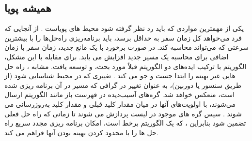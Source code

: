 \subsection{همیشه پویا}
یکی از مهمترین مواردی که باید رد نظر گرفته شود محیط های پویاست . از آنجایی که فرد می‌خواهد کل زمان سفر به حداقل برسد، باید برنامه‌ریزی راه‌حل‌ها را با بیشترین سرعتی که می‌تواند محاسبه کند. در صورت برخورد با یک مانع جدید، زمان سفر با زمان اضافی برای محاسبه یک مسیر جدید افزایش می یابد. برای مقابله با این مشکل، الگوریتم
با ترکیب ایده‌های دو الگوریتم قبلاً مورد بحث،
و 
توسعه یافت. مشابه 
،
راه حل هایی غیر بهینه را ابتدا جست و جو می کند . تغییری که در محیط شناسایی شود (از طریق سنسور یا دوربین)، به عنوان تغییر در گرافی که مسیر در آن برنامه ریزی شده است، منعکس خواهد شد. گره‌های آسیب‌دیده در فهرست باز مانند الگوریتم
ارسال می‌شوند، با اولویت‌های آنها در میان مقدار کلید قبلی و مقدار کلید به‌روزرسانی می شوند . سپس گره های موجود در لیست پردازش می شوند تا زمانی که راه حل فعلی تضمین شود بنابراین
، که یک الگوریتم  برخط است، امکان برنامه ریزی مجدد سریع راه حل ها را با محدود کردن بهینه بودن آنها فراهم می کند. 
